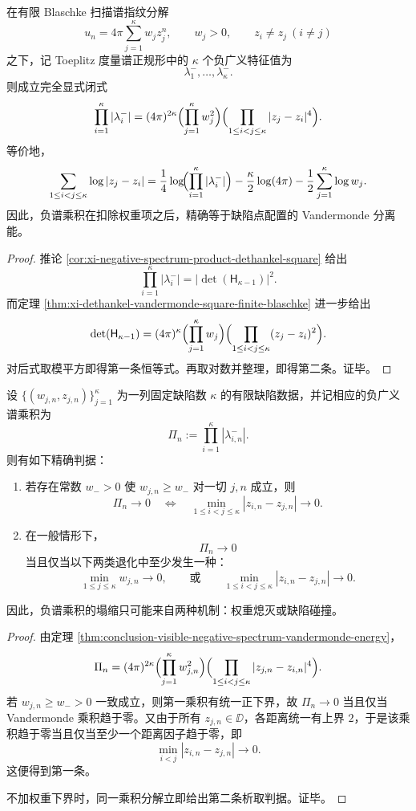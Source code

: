 \begin{theorem}\label{thm:conclusion-visible-negative-spectrum-vandermonde-energy}
在有限 Blaschke 扫描谱指纹分解
\[
u_n=4\pi\sum_{j=1}^{\kappa}w_j z_j^n,
\qquad
w_j>0,
\qquad
z_i\neq z_j\ (i\neq j)
\]
之下，记 Toeplitz 度量谱正规形中的 \(\kappa\) 个负广义特征值为
\[
\lambda_1^-,\dots,\lambda_\kappa^-.
\]
则成立完全显式闭式
\[
\prod_{i=1}^{\kappa}|\lambda_i^-|
=(4\pi)^{2\kappa}
\Bigl(\prod_{j=1}^{\kappa}w_j^2\Bigr)
\Bigl(\prod_{1\le i<j\le\kappa}|z_j-z_i|^4\Bigr).
\]
等价地，
\[
\sum_{1\le i<j\le\kappa}\log|z_j-z_i|
=
\frac14\log\!\Bigl(\prod_{i=1}^{\kappa}|\lambda_i^-|\Bigr)
-\frac{\kappa}{2}\log(4\pi)
-\frac12\sum_{j=1}^{\kappa}\log w_j.
\]
因此，负谱乘积在扣除权重项之后，精确等于缺陷点配置的 Vandermonde 分离能。
\end{theorem}
\begin{proof}
推论 \ref{cor:xi-negative-spectrum-product-dethankel-square} 给出
\[
\prod_{i=1}^{\kappa}|\lambda_i^-|
=
\bigl|\det(\mathsf H_{\kappa-1})\bigr|^2.
\]
而定理 \ref{thm:xi-dethankel-vandermonde-square-finite-blaschke} 进一步给出
\[
\det(\mathsf H_{\kappa-1})
=(4\pi)^{\kappa}
\Bigl(\prod_{j=1}^{\kappa}w_j\Bigr)
\Bigl(\prod_{1\le i<j\le\kappa}(z_j-z_i)^2\Bigr).
\]
对后式取模平方即得第一条恒等式。再取对数并整理，即得第二条。证毕。
\end{proof}

\begin{corollary}[负谱退化的精确二歧]\label{cor:conclusion-visible-negative-spectrum-degeneration-dichotomy}
设 \(\{(w_{j,n},z_{j,n})\}_{j=1}^{\kappa}\) 为一列固定缺陷数 \(\kappa\) 的有限缺陷数据，并记相应的负广义谱乘积为
\[
\Pi_n:=\prod_{i=1}^{\kappa}|\lambda_{i,n}^-|.
\]
则有如下精确判据：
\begin{enumerate}
  \item 若存在常数 \(w_->0\) 使 \(w_{j,n}\ge w_-\) 对一切 \(j,n\) 成立，则
  \[
  \Pi_n\to 0
  \quad\Longleftrightarrow\quad
  \min_{1\le i<j\le \kappa}|z_{i,n}-z_{j,n}|\to 0.
  \]
  \item 在一般情形下，
  \[
  \Pi_n\to 0
  \]
  当且仅当以下两类退化中至少发生一种：
  \[
  \min_{1\le j\le \kappa}w_{j,n}\to 0,
  \qquad\text{或}\qquad
  \min_{1\le i<j\le \kappa}|z_{i,n}-z_{j,n}|\to 0.
  \]
\end{enumerate}
因此，负谱乘积的塌缩只可能来自两种机制：权重熄灭或缺陷碰撞。
\end{corollary}
\begin{proof}
由定理 \ref{thm:conclusion-visible-negative-spectrum-vandermonde-energy}，
\[
\Pi_n
=(4\pi)^{2\kappa}
\Bigl(\prod_{j=1}^{\kappa}w_{j,n}^2\Bigr)
\Bigl(\prod_{1\le i<j\le\kappa}|z_{j,n}-z_{i,n}|^4\Bigr).
\]
若 \(w_{j,n}\ge w_->0\) 一致成立，则第一乘积有统一正下界，故 \(\Pi_n\to 0\) 当且仅当 Vandermonde 乘积趋于零。又由于所有 \(z_{j,n}\in\DD\)，各距离统一有上界 \(2\)，于是该乘积趋于零当且仅当至少一个距离因子趋于零，即
\[
\min_{i<j}|z_{i,n}-z_{j,n}|\to 0.
\]
这便得到第一条。

不加权重下界时，同一乘积分解立即给出第二条析取判据。证毕。
\end{proof}

